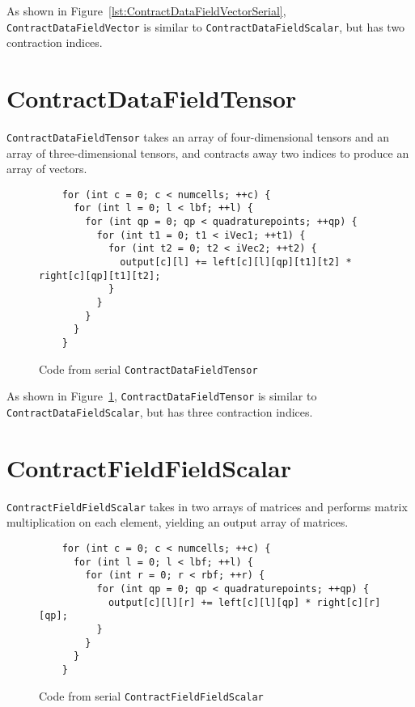 As shown in Figure~\ref{lst:ContractDataFieldVectorSerial},
\texttt{ContractDataFieldVector} is similar to \texttt{ContractDataFieldScalar},
but has two contraction indices. 

\section{ContractDataFieldTensor}
\texttt{ContractDataFieldTensor} takes an array of four-dimensional tensors and
an array of three-dimensional tensors, and contracts away two indices to produce
an array of vectors.

\begin{figure}[ht]
    \begin{lstlisting}
    for (int c = 0; c < numcells; ++c) {
      for (int l = 0; l < lbf; ++l) {
        for (int qp = 0; qp < quadraturepoints; ++qp) {
          for (int t1 = 0; t1 < iVec1; ++t1) {
            for (int t2 = 0; t2 < iVec2; ++t2) {
              output[c][l] += left[c][l][qp][t1][t2] * right[c][qp][t1][t2];
            }
          }
        }
      }
    }
    \end{lstlisting}
\caption{Code from serial \texttt{ContractDataFieldTensor}
\label{lst:ContractDataFieldTensorSerial}} 
\end{figure}

As shown in Figure~\ref{lst:ContractDataFieldTensorSerial},
\texttt{ContractDataFieldTensor} is similar to \texttt{ContractDataFieldScalar},
but has three contraction indices. 

\section{ContractFieldFieldScalar}
\texttt{ContractFieldFieldScalar} takes in two arrays of matrices and performs
matrix multiplication on each element, yielding an output array of matrices.

\begin{figure}[ht]
    \begin{lstlisting}
    for (int c = 0; c < numcells; ++c) {
      for (int l = 0; l < lbf; ++l) {
        for (int r = 0; r < rbf; ++r) {
          for (int qp = 0; qp < quadraturepoints; ++qp) {
            output[c][l][r] += left[c][l][qp] * right[c][r][qp];
          }
        }
      }
    }
    \end{lstlisting}
\caption{Code from serial \texttt{ContractFieldFieldScalar}
\label{lst:ContractFieldFieldScalarSerial}} 
\end{figure}

